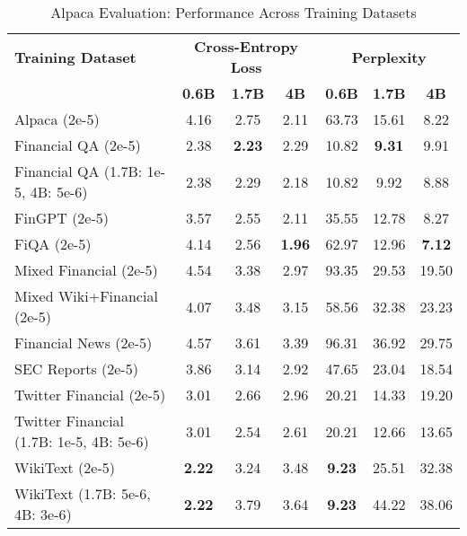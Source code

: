 
\begin{table}[h]
\centering
\caption[Alpaca Evaluation: Cross-Dataset Performance]{Alpaca Evaluation: Performance Across Training Datasets}
\label{tab:cross_alpaca}
\begin{tabular}{l|ccc|ccc}
\hline
\textbf{Training Dataset} & \multicolumn{3}{c|}{\textbf{Cross-Entropy Loss}} & \multicolumn{3}{c}{\textbf{Perplexity}} \\
\cline{2-4} \cline{5-7}
  & \textbf{0.6B} & \textbf{1.7B} & \textbf{4B} & \textbf{0.6B} & \textbf{1.7B} & \textbf{4B} \\
Alpaca (2e-5) & 4.16 & 2.75 & 2.11 & 63.73 & 15.61 & 8.22  \\
Financial QA (2e-5) & 2.38 & \textbf{2.23} & 2.29 & 10.82 & \textbf{9.31} & 9.91  \\
Financial QA (1.7B: 1e-5, 4B: 5e-6) & 2.38 & 2.29 & 2.18 & 10.82 & 9.92 & 8.88  \\
FinGPT (2e-5) & 3.57 & 2.55 & 2.11 & 35.55 & 12.78 & 8.27  \\
FiQA (2e-5) & 4.14 & 2.56 & \textbf{1.96} & 62.97 & 12.96 & \textbf{7.12}  \\
Mixed Financial (2e-5) & 4.54 & 3.38 & 2.97 & 93.35 & 29.53 & 19.50  \\
Mixed Wiki+Financial (2e-5) & 4.07 & 3.48 & 3.15 & 58.56 & 32.38 & 23.23  \\
Financial News (2e-5) & 4.57 & 3.61 & 3.39 & 96.31 & 36.92 & 29.75  \\
SEC Reports (2e-5) & 3.86 & 3.14 & 2.92 & 47.65 & 23.04 & 18.54  \\
Twitter Financial (2e-5) & 3.01 & 2.66 & 2.96 & 20.21 & 14.33 & 19.20  \\
Twitter Financial (1.7B: 1e-5, 4B: 5e-6) & 3.01 & 2.54 & 2.61 & 20.21 & 12.66 & 13.65  \\
WikiText (2e-5) & \textbf{2.22} & 3.24 & 3.48 & \textbf{9.23} & 25.51 & 32.38  \\
WikiText (1.7B: 5e-6, 4B: 3e-6) & \textbf{2.22} & 3.79 & 3.64 & \textbf{9.23} & 44.22 & 38.06  \\
\hline
\end{tabular}
\end{table}

